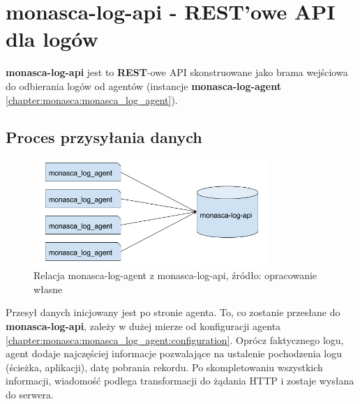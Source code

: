 \section{monasca-log-api - REST'owe API dla logów}
\label{chapter:monasca:monasca_log_api}

\textbf{monasca-log-api} jest to \textbf{REST}-owe API skonstruowane jako
brama wejściowa do odbierania logów od agentów (instancje \textbf{monasca-log-agent}
\ref{chapter:monasca:monasca_log_agent}).
    
    \subsection{Proces przysyłania danych}
    \begin{figure}[H]
        \centering
        \includegraphics[width=0.80\textwidth]{images/monasca_log_api_data_flow}
        \caption[Relacja monasca-log-agent z monasca-log-api]{
            Relacja monasca-log-agent z monasca-log-api, źródło: opracowanie własne
        }
        \label{chapter:monasca:monasca_log_api:data_flow}
    \end{figure}
    Przesył danych inicjowany jest po stronie agenta. To, co zostanie przesłane
    do \textbf{monasca-log-api}, zależy w dużej mierze od konfiguracji agenta 
    \ref{chapter:monasca:monasca_log_agent:configuration}. Oprócz faktycznego
    logu, agent dodaje najczęściej informacje pozwalające na ustalenie pochodzenia logu (ścieżka, aplikacji),
    datę pobrania rekordu. Po skompletowaniu wszystkich informacji, wiadomość podlega
    transformacji do żądania HTTP i zostaje wysłana do serwera.
    

